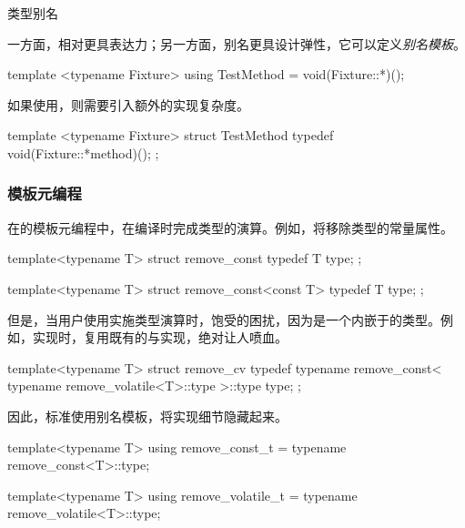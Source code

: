 \begin{content}
\begin{episode}{类型别名}
\begin{content}
一方面，相对更具表达力；另一方面，别名更具设计弹性，它可以定义\emph{别名模板}。


\begin{c++}[title={\ttfamily{使用using：定义别名模板}}]
template <typename Fixture>
using TestMethod = void(Fixture::*)();
\end{c++}

如果使用，则需要引入额外的实现复杂度。

\begin{c++}[title={\ttfamily{使用typedef：定义别名模板}}]
template <typename Fixture>
struct TestMethod {
  typedef void(Fixture::*method)();
};
\end{c++}

\subsubsection{模板元编程}

在\cpp{}的模板元编程中，在编译时完成类型的演算。例如，将移除类型的常量属性。

\begin{c++}[title={\ttfamily{类型演算：remvoe\_const实现}}]
template<typename T>
struct remove_const { 
  typedef T type; 
};

template<typename T>
struct remove_const<const T> { 
  typedef T type; 
};
\end{c++}

但是，当用户使用实施类型演算时，饱受的困扰，因为是一个内嵌于的类型。例如，实现时，复用既有的与实现，绝对让人喷血。

\begin{c++}[title={\ttfamily{类型演算：remvoe\_cv实现}}]
template<typename T>
struct remove_cv {
  typedef typename remove_const<
    typename remove_volatile<T>::type
  >::type type;
};
\end{c++}

因此，标准使用别名模板，将实现细节隐藏起来。

\begin{c++}[title={\ttfamily{C++14: 别名模板}}]
template<typename T>
using remove_const_t = typename remove_const<T>::type;

template<typename T>
using remove_volatile_t = typename remove_volatile<T>::type;
\end{c++}


\end{content}
\end{episode}
\end{content}

